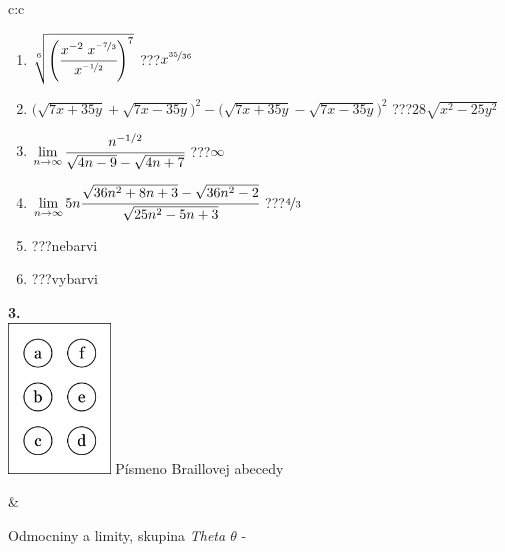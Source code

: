 \documentclass[10pt]{report}
\begin{document}
\begin{tabular}{c:c}
\begin{minipage}[c][104.5mm][t]{0.5\linewidth}
\begin{center}
\begin{minipage}{0.79\linewidth}
\begin{center}
\begin{varwidth}{\linewidth}
\begin{enumerate}
\small
\item $\sqrt[6]{\left(\cfrac{x^{-2}\;x^{\nicefrac{-7}{3}}}{x^{\nicefrac{-1}{2}}}\right)^{7}}$\quad \dotfill\; ???\;\dotfill \quad $x^{\nicefrac{35}{36}}$
\item {\footnotesize{\scriptsize$\big(\sqrt{7x+35y}+\sqrt{7x-35y}\big)^2-\big(\sqrt{7x+35y}-\sqrt{7x-35y}\big)^2$}\quad \dotfill\; ???\;\dotfill \quad $28\sqrt{x^2-25y^2}$}
\item $\lim\limits_{n\to\infty}\cfrac{n^{-1/2}}{\sqrt{4n-9}-\sqrt{4n+7}}$\quad \dotfill\; ???\;\dotfill \quad $\infty$
\item $\lim\limits_{n\to\infty}5n\cfrac{\sqrt{36n^2+8n+3}-\sqrt{36n^2-2}}{\sqrt{25n^2-5n+3}}$\quad \dotfill\; ???\;\dotfill \quad $\nicefrac{4}{3}$
\item \quad \dotfill\; ???\;\dotfill \quad nebarvi
\item \quad \dotfill\; ???\;\dotfill \quad vybarvi
\end{enumerate}
\end{varwidth}
\end{center}
\end{minipage}
\begin{minipage}{0.20\linewidth}
\begin{center}
{\Huge\bfseries 3.} \\[2mm]
\includegraphics[height=40mm]{../images/braille.png}
{\small Písmeno Braillovej abecedy}
\end{center}
\end{minipage}
\end{center}
\end{minipage}
&
\begin{minipage}[c][104.5mm][t]{0.5\linewidth}
\begin{center}
\vspace{7mm}
{\huge Odmocniny a limity, skupina \textit{Theta $\theta$} -}\\[5mm]

\end{center}
\end{minipage}
\end{tabular}
\end{document}
